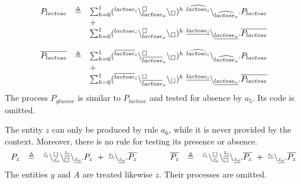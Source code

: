 \[
\begin{array}{lcllcl}
P_{lactose} &\defeq &%
\sum_{h=0}^1 (\startchain{lactose_i}\chainedlink{lactose_o}{\noact}\chainend{\noact})^h\ \link{\widehat{lactose_i}}{\widehat{lactose_o}}.P_{lactose}
\\
&& + \\
&& \sum_{h=0}^1 (\startchain{lactose_i}\chainedlink{lactose_o}{\noact}\chainend{\noact})^h\ \link{\underline{lactose_i}}{\underline{lactose_o}}.\overline{P_{lactose}}\\
\\
\overline{P_{lactose}} &\defeq &\sum_{h=0}^1 (\startchain{\overline{lactose}_i}\chainedlink{\overline{lactose}_o}{\noact}\chainend{\noact})^h\ \link{\widehat{lactose_i}}{\widehat{lactose_o}}.P_{lactose}\\
&&+\\
&& \sum_{h=0}^1 (\startchain{\overline{lactose}_i}\chainedlink{\overline{lactose}_o}{\noact}\chainend{\noact})^h\ \link{\underline{lactose_i}}{\underline{lactose_o}}.\overline{P_{lactose}}\\
\end{array}
\]
\noindent
The  process $P_{glucose}$ is similar to $P_{lactose}$ and tested for absence by $a_5$. 
Its code is omitted.

The entity $z$ can only be produced by rule $a_6$, while it is never provided by the context. Moreover, there is no rule for testing its presence or absence.
\[
\begin{array}{lcl@{\qquad\qquad}lcl}
P_z&\defeq &\startchain{\tilde{z_i}}\chainedlink{\tilde{z_o}}{\noact}\chainedlink{\noact}{\underline{z_i}}\chainend{\underline{z_o}}.P_z\ + \
\link{\underline{z_i}}{\underline{z_o}}.\overline{P_z}
&
\overline{P_z} &\defeq &\startchain{\tilde{z_i}}\chainedlink{\tilde{z_o}}{\noact}\chainedlink{\noact}{\underline{z_i}}\chainend{\underline{z_o}}.\overline{P_z}\ + \
\link{\underline{z_i}}{\underline{z_o}}.\overline{P_z}\\\end{array}
\]
\noindent
The entities $y$ and $A$ are treated likewise $z$. Their processes are omitted.



